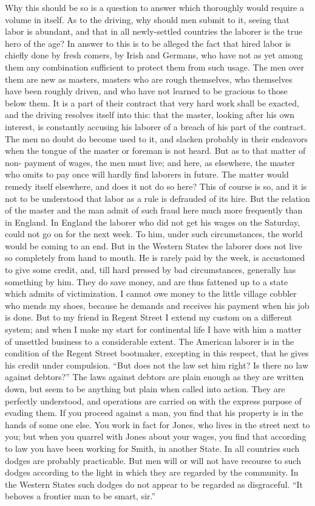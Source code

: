 Why this should be so is a question to answer which thoroughly
would require a volume in itself.  As to the driving, why should
men submit to it, seeing that labor is abundant, and that in all
newly-settled countries the laborer is the true hero of the age?
In answer to this is to be alleged the fact that hired labor is
chiefly done by fresh comers, by Irish and Germans, who have not as
yet among them any combination sufficient to protect them from such
usage.  The men over them are new as masters, masters who are rough
themselves, who themselves have been roughly driven, and who have
not learned to be gracious to those below them.  It is a part of
their contract that very hard work shall be exacted, and the
driving resolves itself into this: that the master, looking after
his own interest, is constantly accusing his laborer of a breach of
his part of the contract.  The men no doubt do become used to it,
and slacken probably in their endeavors when the tongue of the
master or foreman is not heard.  But as to that matter of non-
payment of wages, the men must live; and here, as elsewhere, the
master who omits to pay once will hardly find laborers in future.
The matter would remedy itself elsewhere, and does it not do so
here?  This of course is so, and it is not to be understood that
labor as a rule is defrauded of its hire.  But the relation of the
master and the man admit of such fraud here much more frequently
than in England.  In England the laborer who did not get his wages
on the Saturday, could not go on for the next week.  To him, under
such circumstances, the world would be coming to an end.  But in
the Western States the laborer does not live so completely from
hand to mouth.  He is rarely paid by the week, is accustomed to
give some credit, and, till hard pressed by bad circumstances,
generally has something by him.  They do save money, and are thus
fattened up to a state which admits of victimization.  I cannot owe
money to the little village cobbler who mends my shoes, because he
demands and receives his payment when his job is done.  But to my
friend in Regent Street I extend my custom on a different system;
and when I make my start for continental life I have with him a
matter of unsettled business to a considerable extent.  The
American laborer is in the condition of the Regent Street
bootmaker, excepting in this respect, that he gives his credit
under compulsion.  ``But does not the law set him right?  Is there
no law against debtors?''  The laws against debtors are plain enough
as they are written down, but seem to be anything but plain when
called into action.  They are perfectly understood, and operations
are carried on with the express purpose of evading them.  If you
proceed against a man, you find that his property is in the hands
of some one else.  You work in fact for Jones, who lives in the
street next to you; but when you quarrel with Jones about your
wages, you find that according to law you have been working for
Smith, in another State.  In all countries such dodges are probably
practicable.  But men will or will not have recourse to such dodges
according to the light in which they are regarded by the community.
In the Western States such dodges do not appear to be regarded as
disgraceful.  ``It behoves a frontier man to be smart, sir.''

